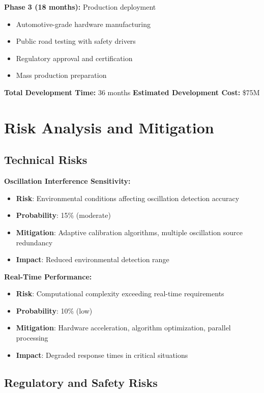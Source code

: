 \documentclass[11pt,a4paper]{article}
\begin{document}
\textbf{Phase 3 (18 months):} Production deployment
\begin{itemize}
    \item Automotive-grade hardware manufacturing
    \item Public road testing with safety drivers
    \item Regulatory approval and certification
    \item Mass production preparation
\end{itemize}

\textbf{Total Development Time:} 36 months
\textbf{Estimated Development Cost:} \$75M

\section{Risk Analysis and Mitigation}

\subsection{Technical Risks}

\textbf{Oscillation Interference Sensitivity:}
\begin{itemize}
    \item \textbf{Risk}: Environmental conditions affecting oscillation detection accuracy
    \item \textbf{Probability}: 15\% (moderate)
    \item \textbf{Mitigation}: Adaptive calibration algorithms, multiple oscillation source redundancy
    \item \textbf{Impact}: Reduced environmental detection range
\end{itemize}

\textbf{Real-Time Performance:}
\begin{itemize}
    \item \textbf{Risk}: Computational complexity exceeding real-time requirements
    \item \textbf{Probability}: 10\% (low)
    \item \textbf{Mitigation}: Hardware acceleration, algorithm optimization, parallel processing
    \item \textbf{Impact}: Degraded response times in critical situations
\end{itemize}

\subsection{Regulatory and Safety Risks}
\end{document}
